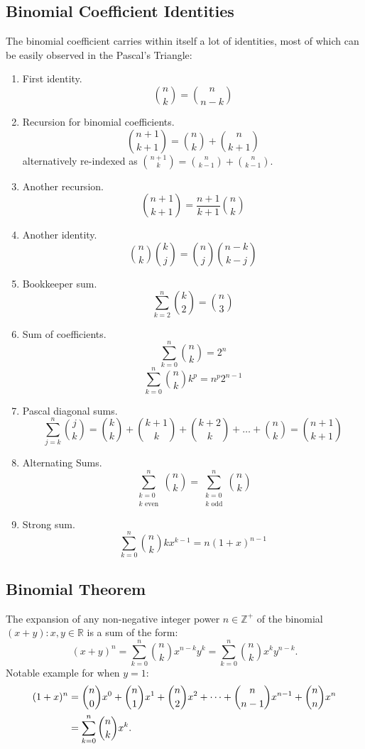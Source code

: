 \documentclass{article}
\newenvironment{theorem}[1]{%
    \trivlist
    \item[\hskip\labelsep\textbf{Theorem. #1.}]
    \ignorespaces
}{%
    \endtrivlist
}
\newenvironment{identities}[1]{%
    \trivlist
    \item[\hskip\labelsep\textbf{Identities. #1.}]
    \ignorespaces
}{%
    \endtrivlist
}
\begin{document}
\subsection{Binomial Coefficient Identities}

\begin{identities}{Binomial Coefficient}
    The binomial coefficient carries within itself a lot of identities, most of which can be easily observed in the Pascal's Triangle:
    \begin{enumerate}
        \item First identity.
        \[\binom{n}{k}=\binom{n}{n-k}\]
        \item Recursion for binomial coefficients.
        \[\binom{n+1}{k+1}=\binom{n}{k}+\binom{n}{k+1}\]
        alternatively re-indexed as $\binom{n+1}{k}=\binom{n}{k-1}+\binom{n}{k-1}$.
        \item Another recursion.
        \[\binom{n+1}{k+1} = \frac{n+1}{k+1} \binom{n}{k}\]
        \item Another identity.
        \[\binom{n}{k}\binom{k}{j} = \binom{n}{j}\binom{n-k}{k-j}\]
        \item Bookkeeper sum.
        \[\sum_{k=2}^{n} \binom{k}{2} = \binom{n}{3}\]
        \item Sum of coefficients.
        \[\sum_{k=0}^{n} \binom{n}{k} = 2^n\]
        \[\sum_{k=0}^{n} \binom{n}{k} k^p = n^p 2^{n-1}\]
        \item Pascal diagonal sums.
        \[\sum_{j=k}^{n} \binom{j}{k}=\binom{k}{k} + \binom{k+1}{k} + \binom{k+2}{k} + \dots + \binom{n}{k} = \binom{n+1}{k+1}\]
        \item Alternating Sums.
        \[\sum_{\substack{k=0 \\ k \text{ even}}}^{n} \binom{n}{k} =\sum_{\substack{k=0 \\ k \text{ odd}}}^{n} \binom{n}{k}\]
        \item Strong sum.
        \[\sum_{k=0}^{n} \binom{n}{k} kx^{k-1} = n(1+x)^{n-1}\]
    \end{enumerate}
\end{identities}

\subsection{Binomial Theorem}

\begin{theorem}{Binomial Theorem}
    The expansion of any non-negative integer power $n\in\mathbb{Z}^{+}$ of the binomial $(x + y): x,y\in\mathbb{R}$ is a sum of the form:
    \[ (x+y)^{n}=\sum _{k=0}^{n} \binom{n}{k} x^{n-k}y^{k}=\sum _{k=0}^{n} \binom{n}{k} x^{k}y^{n-k}. \]
    Notable example for when $y=1$:
    $$
    \begin{aligned}
        (1+x)^{n}&=\binom{n}{0}x^{0}+\binom{n}{1}x^{1}+\binom{n}{2}x^{2}+\cdots +\binom{n}{n-1}x^{n-1}+\binom{n}{n}x^{n}\\
        &=\sum _{k=0}^{n}\binom{n}{k}x^{k}.{\vphantom {\Bigg )}}
    \end{aligned}
    $$
\end{theorem}
\end{document}
